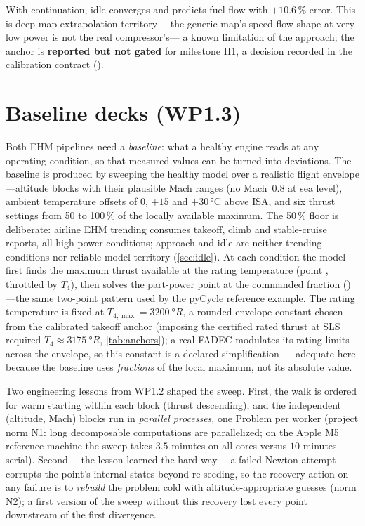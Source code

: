 With continuation, idle converges and predicts fuel flow with $+10.6$\,\% error. This is deep
map-extrapolation territory ---the generic map's speed-flow shape at very low power is not the
real compressor's--- a known limitation of the approach; the anchor is \textbf{reported but not
gated} for milestone H1, a decision recorded in the calibration contract
().

\section{Baseline decks (WP1.3)}
\label{sec:decks}

Both EHM pipelines need a \emph{baseline}: what a healthy engine reads at any operating
condition, so that measured values can be turned into deviations. The baseline is produced by
sweeping the healthy model over a realistic flight envelope ---altitude blocks with their
plausible Mach ranges (no Mach~0.8 at sea level), ambient temperature offsets of 0, $+15$ and
$+30$\,\si{\degreeCelsius} above ISA, and six thrust settings from 50 to 100\,\% of the locally
available maximum. The 50\,\% floor is deliberate: airline EHM trending consumes takeoff,
climb and stable-cruise reports, all high-power conditions; approach and idle are neither
trending conditions nor reliable model territory (\cref{sec:idle}). At each condition the
model first finds the maximum thrust available at the rating temperature (point
, throttled by $T_4$), then solves the part-power point at the commanded
fraction () ---the same two-point pattern used by the pyCycle reference example.
The rating temperature is fixed at $T_{4,\max} = \SI{3200}{\degree R}$, a rounded envelope
constant chosen from the calibrated takeoff anchor (imposing the certified rated thrust at SLS
required $T_4 \approx \SI{3175}{\degree R}$, \cref{tab:anchors}); a real FADEC modulates
its rating limits across the envelope, so this constant is a declared simplification ---
adequate here because the baseline uses \emph{fractions} of the local maximum, not its
absolute value.

Two engineering lessons from WP1.2 shaped the sweep. First, the walk is ordered for warm
starting within each block (thrust descending), and the independent (altitude, Mach) blocks run
in \emph{parallel processes}, one Problem per worker (project norm N1: long decomposable
computations are parallelized; on the Apple M5 reference machine the sweep takes $3.5$ minutes on all cores versus $10$ minutes
serial). Second ---the lesson learned the hard way--- a failed Newton attempt corrupts the
point's internal states beyond re-seeding, so the recovery action on any failure is to
\emph{rebuild} the problem cold with altitude-appropriate guesses (norm N2); a first version of
the sweep without this recovery lost every point downstream of the first divergence.


